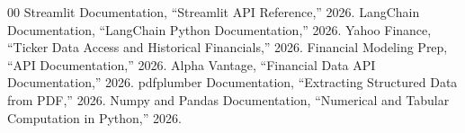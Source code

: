 \documentclass[conference]{IEEEtran}
\begin{document}
\begin{thebibliography}{00}
 Streamlit Documentation, ``Streamlit API Reference,'' 2026.
 LangChain Documentation, ``LangChain Python Documentation,'' 2026.
 Yahoo Finance, ``Ticker Data Access and Historical Financials,'' 2026.
 Financial Modeling Prep, ``API Documentation,'' 2026.
 Alpha Vantage, ``Financial Data API Documentation,'' 2026.
 pdfplumber Documentation, ``Extracting Structured Data from PDF,'' 2026.
 Numpy and Pandas Documentation, ``Numerical and Tabular Computation in Python,'' 2026.
\end{thebibliography}
\end{document}
